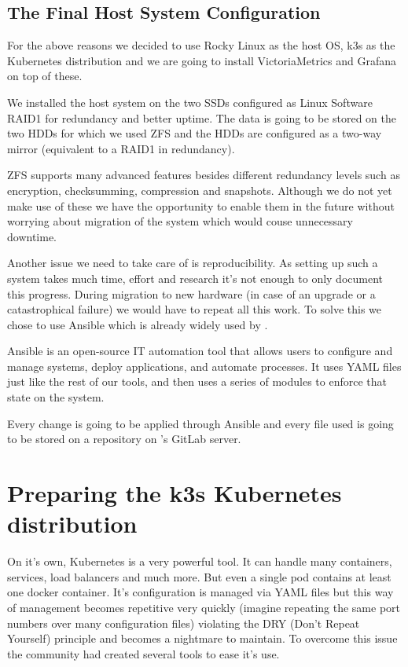 \subsection{The Final Host System Configuration}

For the above reasons we decided to use Rocky Linux as the host OS, k3s as the
Kubernetes distribution and we are going to install VictoriaMetrics and Grafana
on top of these.

We installed the host system on the two SSDs configured as Linux Software RAID1
for redundancy and better uptime. The data is going to be stored on the two
HDDs for which we used ZFS and the HDDs are configured as a two-way mirror
(equivalent to a RAID1 in redundancy).

ZFS supports many advanced features besides different redundancy levels such as
encryption, checksumming, compression and snapshots. Although we do not yet
make use of these we have the opportunity to enable them in the future without
worrying about migration of the system which would couse unnecessary downtime.

Another issue we need to take care of is reproducibility. As setting up such a
system takes much time, effort and research it's not enough to only document
this progress. During migration to new hardware (in case of an upgrade or a
catastrophical failure) we would have to repeat all this work. To solve this we
chose to use Ansible which is already widely used by \kszk.

Ansible is an open-source IT automation tool that allows users to configure and
manage systems, deploy applications, and automate processes. It uses YAML files
just like the rest of our tools, and then uses a series of modules to enforce
that state on the system.

Every change is going to be applied through Ansible and every file used is
going to be stored on a repository on \kszk's GitLab server.

\section{Preparing the k3s Kubernetes distribution}

On it's own, Kubernetes is a very powerful tool. It can handle many containers,
services, load balancers and much more. But even a single pod contains at least
one docker container. It's configuration is managed via YAML files but this way
of management becomes repetitive very quickly (imagine repeating the same port
numbers over many configuration files) violating the DRY (Don't Repeat
Yourself) principle and becomes a nightmare to maintain. To overcome this issue
the community had created several tools to ease it's use.

